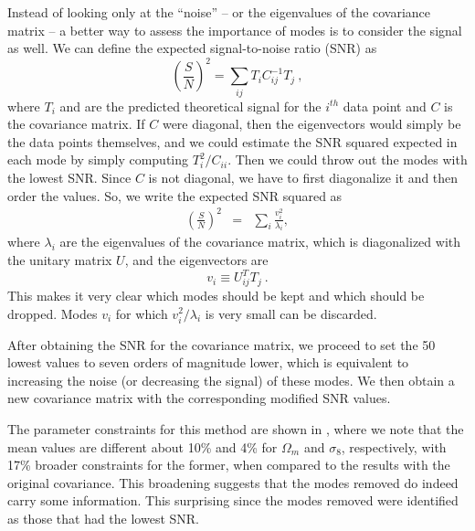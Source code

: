 \documentclass[twocolumn]{\docclass}
\newcommand\be{\begin{equation}}
\newcommand\ee{\end{equation}}
\def\bea{\begin{eqnarray}}
\def\eea{\end{eqnarray}}
\begin{document}
	Instead of looking only at the ``noise'' -- or the eigenvalues of the covariance matrix -- a better way to assess the importance of modes is to consider the signal as well. We can define the expected signal-to-noise ratio (SNR) as
	\be
	\left(\frac{S}{N}\right)^2 = \sum_{ij} T_i C^{-1}_{ij} T_j\
	,\ee
	where $T_i$ and are the predicted theoretical signal for the $i^{th}$ data point and $C$ is the covariance matrix. If $C$ were diagonal, then the eigenvectors would simply be the data points themselves, and we could estimate the SNR squared expected in each mode by simply computing $T_i^2/C_{ii}$. Then we could throw out the modes with the lowest SNR. Since $C$ is not diagonal, we have to first diagonalize it and then order the values. So, we write the expected SNR squared as
	\bea
	\left(\frac{S}{N}\right)^2 %
	&=& \sum_{i} \frac{v_i^2}{\lambda_i}
	,\eea
	where $\lambda_i$ are the eigenvalues of the covariance matrix, which is diagonalized with the unitary matrix $U$, and the eigenvectors are 
	\be
	v_i\equiv U_{ij}^T T_j\
	.\ee
	This makes it very clear which modes should be kept and which should be dropped. Modes $v_i$ for which $v_i^2/\lambda_i$ is very small can be discarded. 
	
	After obtaining the SNR for the covariance matrix, we proceed to set the 50 lowest values to seven orders of magnitude lower, which is equivalent to increasing the noise (or decreasing the signal) of these modes. We then obtain a new covariance matrix with the corresponding modified SNR values. 
	
	
	The parameter constraints for this method are shown in , where we note that the mean values are different about 10\% and 4\% for $\Omega_m$ and $\sigma_8$, respectively, with 17\% broader constraints for the former, when compared to the results with the original covariance. This broadening suggests that the modes removed do indeed carry some information. This surprising since the modes removed were identified as those that had the lowest SNR.
\end{document}

